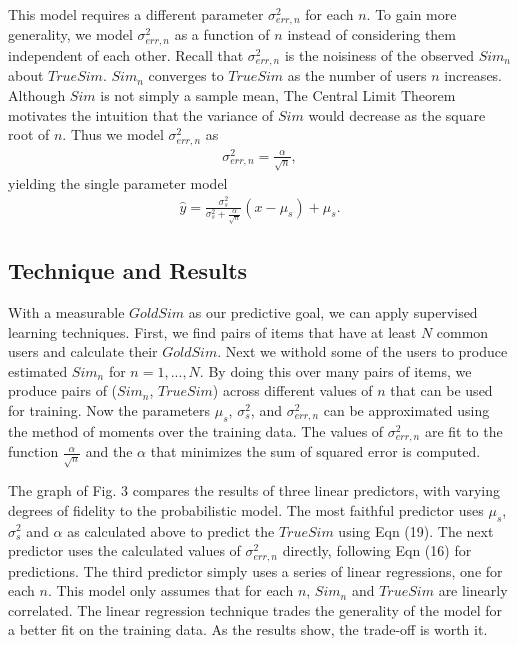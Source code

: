 \documentclass[11pt]{article}
\begin{document}
This model requires a different parameter $\sigma_{err,n}^2$ for each $n$.  To
gain more generality, we model $\sigma_{err,n}^2$ as a function of $n$ instead
of considering them independent of each other. Recall that $\sigma_{err,n}^2$ is
the noisiness of the observed $Sim_n$ about $TrueSim$.  $Sim_n$ converges to
$TrueSim$ as the number of users $n$ increases. Although $Sim$ is not simply a
sample mean, The Central Limit Theorem motivates the intuition that the variance
of $Sim$ would decrease as the square root of $n$. Thus we model
$\sigma_{err,n}^2$ as
\begin{align}
\sigma_{err,n}^2 = \frac{\alpha}{\sqrt{n}},
\end{align}
yielding the single parameter model
\begin{align}
\hat{y}= \frac{\sigma_{s}^2}{\sigma_{s}^2+\frac{\alpha}{\sqrt{n}}}
\left(x -\mu_s\right) + \mu_s.
\end{align}

\subsection*{Technique and Results}
With a measurable $GoldSim$ as our predictive goal, we can apply supervised 
learning techniques. First, we find pairs of items that have at least $N$ common
users and calculate their $GoldSim$. Next we withold some of the users to 
produce estimated $Sim_n$ for $n=1,...,N$. By doing this over many pairs of 
items, we produce pairs of ($Sim_n$, $TrueSim$) across different values of $n$ 
that can be used for training. Now the parameters $\mu_s$, $\sigma_{s}^2$, and 
$\sigma_{err,n}^2$ can be approximated using the method of moments over the 
training data. The values of $\sigma_{err,n}^2$ are fit to the function 
$\frac{\alpha}{\sqrt{n}}$ and the $\alpha$ that minimizes the sum of squared 
error is computed.

The graph of Fig. 3 compares the results of three linear predictors, with
varying degrees of fidelity to the probabilistic model. The most faithful
predictor uses $\mu_s$, $\sigma_{s}^2$ and $\alpha$ as calculated above to
predict the $TrueSim$ using Eqn (19). The next predictor uses the calculated
values of $\sigma_{err,n}^2$ directly, following Eqn (16) for predictions. The
third predictor simply uses a series of linear regressions, one for each $n$.
This model only assumes that for each $n$, $Sim_n$ and $TrueSim$ are linearly
correlated. The linear regression technique trades the generality of the model
for a better fit on the training data.  As the results show, the trade-off is
worth it.
\end{document}
